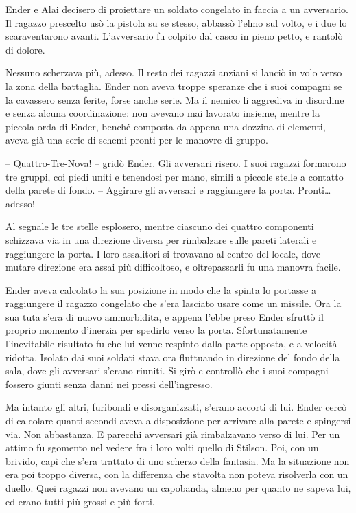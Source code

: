 {Ender e Alai decisero di proiettare un soldato congelato in faccia a un
	avversario. Il ragazzo prescelto usò la pistola su se stesso, abbassò
	l'elmo sul volto, e i due lo scaraventarono avanti. L'avversario fu
	colpito dal casco in pieno petto, e rantolò di dolore.}

{Nessuno scherzava più, adesso. Il resto dei ragazzi anziani si lanciò
	in volo verso la zona della battaglia. Ender non aveva troppe speranze
	che i suoi compagni se la cavassero senza ferite, forse anche serie. Ma
	il nemico li aggrediva in disordine e senza alcuna coordinazione: non
	avevano mai lavorato insieme, mentre la piccola orda di Ender, benché
	composta da appena una dozzina di elementi, aveva già una serie di
	schemi pronti per le manovre di gruppo.}

{-- Quattro-Tre-Nova! -- gridò Ender. Gli avversari risero. I suoi
	ragazzi formarono tre gruppi, coi piedi uniti e tenendosi per mano,
	simili a piccole stelle a contatto della parete di fondo. -- Aggirare
	gli avversari e raggiungere la porta. Pronti\ldots{} adesso!}

{Al segnale le tre stelle esplosero, mentre ciascuno dei quattro
	componenti schizzava via in una direzione diversa per rimbalzare sulle
	pareti laterali e raggiungere la porta. I loro assalitori si trovavano
	al centro del locale, dove mutare direzione era assai più difficoltoso,
	e oltrepassarli fu una manovra facile.}

{Ender aveva calcolato la sua posizione in modo che la spinta lo
	portasse a raggiungere il ragazzo congelato che s'era lasciato usare
	come un missile. Ora la sua tuta s'era di nuovo ammorbidita, e appena
	l'ebbe preso Ender sfruttò il proprio momento d'inerzia per spedirlo
	verso la porta. Sfortunatamente l'inevitabile risultato fu che lui venne
	respinto dalla parte opposta, e a velocità ridotta. Isolato dai suoi
	soldati stava ora fluttuando in direzione del fondo della sala, dove gli
	avversari s'erano riuniti. Si girò e controllò che i suoi compagni
	fossero giunti senza danni nei pressi dell'ingresso.}

{Ma intanto gli altri, furibondi e disorganizzati, s'erano accorti di
	lui. Ender cercò di calcolare quanti secondi aveva a disposizione per
	arrivare alla parete e spingersi via. Non abbastanza. E parecchi
	avversari già rimbalzavano verso di lui. Per un attimo fu sgomento nel
	vedere fra i loro volti quello di Stilson. Poi, con un brivido, capì che
	s'era trattato di uno scherzo della fantasia. Ma la situazione non era
	poi troppo diversa, con la differenza che stavolta non poteva risolverla
	con un duello. Quei ragazzi non avevano un capobanda, almeno per quanto
	ne sapeva lui, ed erano tutti più grossi e più forti.}

